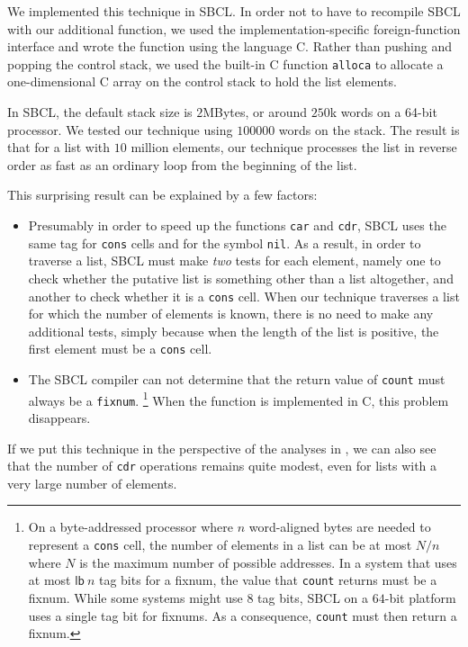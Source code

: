 We implemented this technique in SBCL.  In order not to have to
recompile SBCL with our additional function, we used the
implementation-specific foreign-function interface and wrote the
function using the language C.  Rather than pushing and popping the
control stack, we used the built-in C function \texttt{alloca} to
allocate a one-dimensional C array on the control stack to hold the
list elements.

In SBCL, the default stack size is $2$MBytes, or around $250$k words
on a 64-bit processor.  We tested our technique using $100000$ words
on the stack.  The result is that for a list with $10$ million
elements, our technique processes the list in reverse order as fast as
an ordinary loop from the beginning of the list.

This surprising result can be explained by a few factors:

\begin{itemize}
\item Presumably in order to speed up the functions \texttt{car} and
  \texttt{cdr}, SBCL uses the same tag for \texttt{cons} cells and for
  the symbol \texttt{nil}.  As a result, in order to traverse a list,
  SBCL must make \emph{two} tests for each element, namely one to
  check whether the putative list is something other than a list
  altogether, and another to check whether it is a \texttt{cons}
  cell.  When our technique traverses a list for which the number of
  elements is known, there is no need to make any additional tests,
  simply because when the length of the list is positive, the first
  element must be a \texttt{cons} cell.
\item The SBCL compiler can not determine that the return value of
  \texttt{count} must always be a \texttt{fixnum}.%
  \footnote{On a byte-addressed processor where $n$ word-aligned bytes
    are needed to represent a \texttt{cons} cell, the number of
    elements in a list can be at most $N/n$ where $N$ is the maximum
    number of possible addresses.  In a system that uses at most
    $\mathsf{lb}~n$ tag bits for a fixnum, the value that
    \texttt{count} returns must be a fixnum.  While some systems might
    use $8$ tag bits, SBCL on a $64$-bit platform uses a single tag
    bit for fixnums.  As a consequence, \texttt{count} must then
    return a fixnum.}
  When the function is implemented in C, this problem disappears.
\end{itemize}

If we put this technique in the perspective of the analyses in
, we can also see that the number of \texttt{cdr}
operations remains quite modest, even for lists with a very large
number of elements.

